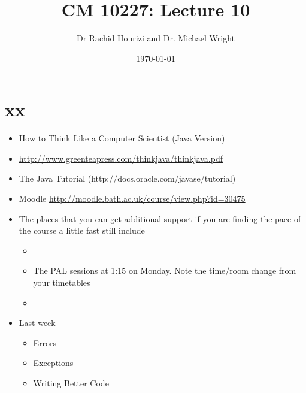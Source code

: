 \documentclass{beamer}
\begin{document}

\title{CM 10227: Lecture 10}
\author{Dr Rachid Hourizi and Dr. Michael Wright}
\date{\today}
\frame{\titlepage}

\section{xx}
\begin{frame} 
\begin{itemize}
\item How to Think Like a Computer Scientist (Java Version)
\item \url{http://www.greenteapress.com/thinkjava/thinkjava.pdf}
\item The Java Tutorial (http://docs.oracle.com/javase/tutorial)
\item Moodle \url{http://moodle.bath.ac.uk/course/view.php?id=30475}
\end{itemize}
\end{frame}

\begin{frame} 
\begin{itemize}
\item The places that you can get additional support if you are finding the pace of the course a little fast still include
\begin{itemize}
\item {}
\item The PAL sessions at 1:15 on Monday. Note the time/room change from your
timetables
\item {}
\end{itemize}
\end{itemize}
\end{frame}

\begin{frame}
\begin{itemize}
\item Last week 
\begin{itemize}
\item Errors
\item Exceptions
\item Writing Better Code
\end{itemize}
\end{itemize}
\end{frame}
\end{document}
